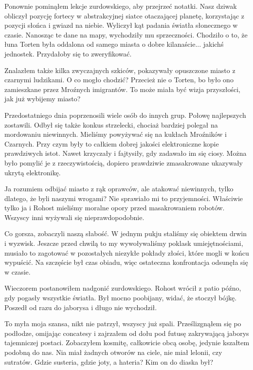Ponownie pominąłem lekcje zurdowskiego, aby przejrzeć notatki.
Nasz dziwak obliczył pozycję fortecy w abstrakcyjnej siatce otaczającej planetę, korzystając z pozycji słońca i gwiazd na niebie.
Wyliczył kąt padania światła słonecznego w czasie.
Nanosząc te dane na mapy, wychodziły mu sprzeczności.
Chodziło o to, że łuna Torten była oddalona od samego miasta o dobre kilanaście... jakichś jednostek.
Przydałoby się to zweryfikować.

Znalazłem także kilka zwyczajnych szkiców, pokazywały opuszczone miasto z czarnymi ludzikami.
O co mogło chodzić? Przecież nie o Torten, bo było ono zamieszkane przez Mroźnych imigrantów.
To może miała być wizja przyszłości, jak już wybijemy miasto?

Przedostatniego dnia poprzenosili wiele osób do innych grup.
Połowę najlepszych zostawili.
Odbył się także konkus strzelecki, chociaż bardziej polegał na mordowaniu niewinnych.
Mieliśmy powyżywać się na kukłach Mroźników i Czarnych.
Przy czym były to całkiem dobrej jakości elektroniczne kopie prawdziwych istot.
Nawet krzyczały i fajtysiły, gdy zadawało im się ciosy.
Można było pomylić je z rzeczywistością, dopiero prawdziwie zmasakrowane ukazywały ukrytą elektronikę.

Ja rozumiem odbijać miasto z rąk oprawców, ale atakować niewinnych, tylko dlatego, że byli naszymi wrogami?
Nie sprawiało mi to przyjemności.
Właściwie tylko ja i Rohost mieliśmy moralne opory przed masakrowaniem robotów.
Wszyscy inni wyżywali się nieprawdopodobnie.

Co gorsza, zobaczyli naszą słabość.
W jednym pukju staliśmy się obiektem drwin i wyzwisk.
Jeszcze przed chwilą to my wywoływaliśmy poklask umiejętnościami, musiało to zagotować w pozostałych niezykłe pokłady złości, które mogli w końcu wypuścić.
Na szczęście był czas obiadu, więc ostateczna konfrontacja odsunęła się w czasie.

Wieczorem postanowiłem nadgonić zurdowskiego.
Rohost wrócił z patio późno, gdy pogasły wszystkie światła.
Był mocno poobijany, widać, że stoczył bójkę. 
Poszedł od razu do jaborysa i długo nie wychodził.

To myła moja szansa, nikt nie patrzył, wszyscy już spali.
Prześlizgnąłem się po podłodze, omijając concatesy i zajrzałem od dołu pod futusę zakrywającą jaborys tajemniczej postaci.
Zobaczyłem kosmitę, całkowicie obcą osobę, jedynie kszałtem podobną do nas.
Nia miał żadnych otworów na ciele, nie miał lelonii, czy sutratów.
Gdzie susteria, gdzie joty, a hateria?
Kim on do diaska był?


